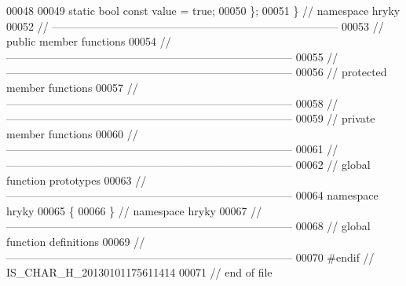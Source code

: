\begin{DoxyCode}
00048 
00049     \textcolor{keyword}{static} \textcolor{keywordtype}{bool} \textcolor{keyword}{const} value = \textcolor{keyword}{true};
00050 \};
00051 \} \textcolor{comment}{// namespace hryky}
00052 \textcolor{comment}{//
      ------------------------------------------------------------------------------}
00053 \textcolor{comment}{// public member functions}
00054 \textcolor{comment}{//
      ------------------------------------------------------------------------------}
00055 \textcolor{comment}{//
      ------------------------------------------------------------------------------}
00056 \textcolor{comment}{// protected member functions}
00057 \textcolor{comment}{//
      ------------------------------------------------------------------------------}
00058 \textcolor{comment}{//
      ------------------------------------------------------------------------------}
00059 \textcolor{comment}{// private member functions}
00060 \textcolor{comment}{//
      ------------------------------------------------------------------------------}
00061 \textcolor{comment}{//
      ------------------------------------------------------------------------------}
00062 \textcolor{comment}{// global function prototypes}
00063 \textcolor{comment}{//
      ------------------------------------------------------------------------------}
00064 \textcolor{keyword}{namespace }hryky
00065 \{
00066 \} \textcolor{comment}{// namespace hryky}
00067 \textcolor{comment}{//
      ------------------------------------------------------------------------------}
00068 \textcolor{comment}{// global function definitions}
00069 \textcolor{comment}{//
      ------------------------------------------------------------------------------}
00070 \textcolor{preprocessor}{#endif // IS\_CHAR\_H\_20130101175611414}
00071 \textcolor{preprocessor}{}\textcolor{comment}{// end of file}
\end{DoxyCode}
